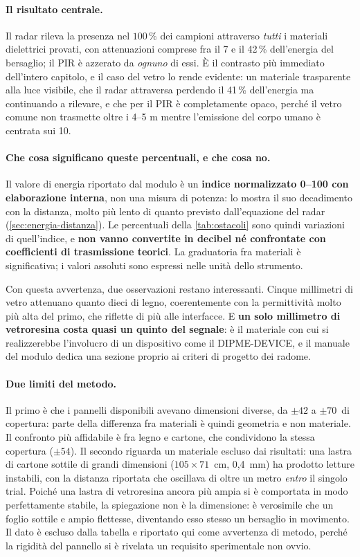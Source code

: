 \paragraph{Il risultato centrale.} Il radar rileva la presenza nel $100\,\%$ dei
campioni attraverso \emph{tutti} i materiali dielettrici provati, con attenuazioni
comprese fra il 7 e il 42\,\% dell'energia del bersaglio; il PIR è azzerato da
\emph{ognuno} di essi. È il contrasto più immediato dell'intero capitolo, e il caso
del vetro lo rende evidente: un materiale trasparente alla luce visibile, che il
radar attraversa perdendo il 41\,\% dell'energia ma continuando a rilevare, e che per
il PIR è completamente opaco, perché il vetro comune non trasmette oltre i 4--5
\textmu m mentre l'emissione del corpo umano è centrata sui 10.

\paragraph{Che cosa significano queste percentuali, e che cosa no.} Il valore di
energia riportato dal modulo è un \textbf{indice normalizzato 0--100 con elaborazione
interna}, non una misura di potenza: lo mostra il suo decadimento con la distanza,
molto più lento di quanto previsto dall'equazione del radar
(\cref{sec:energia-distanza}). Le percentuali della \cref{tab:ostacoli} sono quindi
variazioni di quell'indice, e \textbf{non vanno convertite in decibel né confrontate
con coefficienti di trasmissione teorici}. La graduatoria fra materiali è
significativa; i valori assoluti sono espressi nelle unità dello strumento.

Con questa avvertenza, due osservazioni restano interessanti. Cinque millimetri di
vetro attenuano quanto dieci di legno, coerentemente con la permittività molto più
alta del primo, che riflette di più alle interfacce. E \textbf{un solo millimetro di
vetroresina costa quasi un quinto del segnale}: è il materiale con cui si
realizzerebbe l'involucro di un dispositivo come il DIPME-DEVICE, e il manuale del
modulo dedica una sezione proprio ai criteri di progetto dei radome.

\paragraph{Due limiti del metodo.} Il primo è che i pannelli disponibili avevano
dimensioni diverse, da $\pm 42$ a $\pm 70$\textdegree\ di copertura: parte della
differenza fra materiali è quindi geometria e non materiale. Il confronto più
affidabile è fra legno e cartone, che condividono la stessa copertura
($\pm 54$\textdegree). Il secondo riguarda un materiale escluso dai risultati: una
lastra di cartone sottile di grandi dimensioni ($105 \times 71$~cm, 0,4~mm) ha
prodotto letture instabili, con la distanza riportata che oscillava di oltre un metro
\emph{entro} il singolo trial. Poiché una lastra di vetroresina ancora più ampia si è
comportata in modo perfettamente stabile, la spiegazione non è la dimensione: è
verosimile che un foglio sottile e ampio flettesse, diventando esso stesso un
bersaglio in movimento. Il dato è escluso dalla tabella e riportato qui come
avvertenza di metodo, perché la rigidità del pannello si è rivelata un requisito
sperimentale non ovvio.

